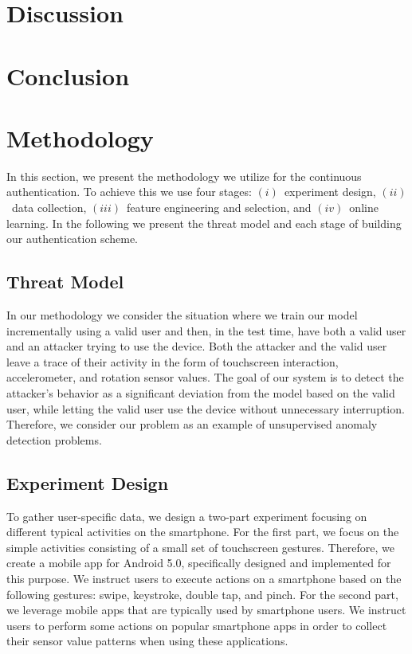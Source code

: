 \documentclass{llncs}
\begin{document}
\section{Discussion}


\section{Conclusion}


\section{Methodology}

In this section, we present the methodology we utilize for the continuous authentication. To achieve this we use four stages: $(i)$~experiment design, $(ii)$~data collection, $(iii)$~feature engineering and selection, and $(iv)$~online learning. In the following we present the threat model and each stage of building our authentication scheme.

\subsection{Threat Model}\label{ssec:threat}
In our methodology we consider the situation where we train our model incrementally using a valid user and then, in the test time, have both a valid user and an attacker trying to use the device. Both the attacker and the valid user leave a trace of their activity in the form of touchscreen interaction, accelerometer, and rotation sensor values. The goal of our system is to detect the attacker's behavior as a significant deviation from the model based on the valid user, while letting the valid user use the device without unnecessary interruption.  Therefore, we consider our problem as an example of unsupervised anomaly detection problems.

\subsection{Experiment Design}

To gather user-specific data, we design a two-part experiment focusing on different typical activities on the smartphone. For the first part, we focus on the simple activities consisting of a small set of touchscreen gestures. Therefore, we create a mobile app for Android 5.0, specifically designed and implemented for this purpose. We instruct users to execute actions on a smartphone based on the following gestures: swipe, keystroke, double tap, and pinch. For the second part, we leverage mobile apps that are typically used by smartphone users. We instruct users to perform some actions on popular smartphone apps in order to collect their sensor value patterns when using these applications.
\end{document}
